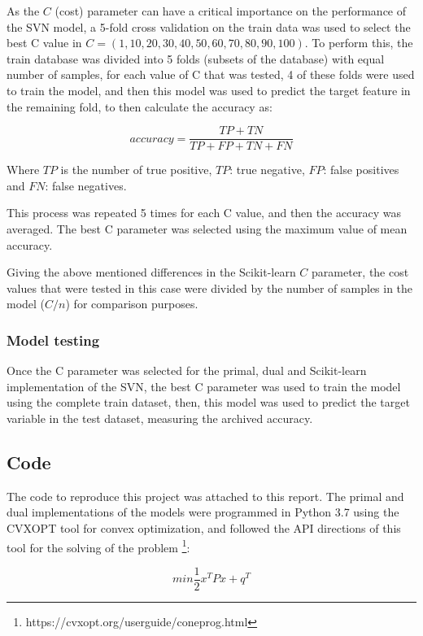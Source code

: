 \documentclass[11pt,twocolumn,letterpaper]{article}
\begin{document}
As the $C$ (cost) parameter can have a critical importance on the performance of the SVN model, a 5-fold cross validation on the train data was used to select the best C value in $C = (1,10,20,30,40,50,60,70,80,90,100)$. To perform this, the train database was divided into 5 folds (subsets of the database) with equal number of samples, for each value of C that was tested, 4 of these folds were used to train the model, and then this model was used to predict the target feature in the remaining fold, to then calculate the accuracy as:

\begin{equation}
	accuracy = \frac{TP+TN}{TP+FP+TN+FN}
\end{equation}

Where $TP$ is the number of true positive, $TP$: true negative, $FP$: false positives and $FN$: false negatives.

This process was repeated 5 times for each C value, and then the accuracy was averaged. The best C parameter was selected using the maximum value of mean accuracy.

Giving the above mentioned differences in the Scikit-learn $C$ parameter, the cost values that were tested in this case were divided by the number of samples in the model ($C/n$) for comparison purposes.

\subsubsection{Model testing}

Once the C parameter was selected for the primal, dual and Scikit-learn implementation of the SVN, the best C parameter was used to train the model using the complete train dataset, then, this model was used to predict the target variable in the test dataset, measuring the archived accuracy. 

\subsection{Code}

The code to reproduce this project was attached to this report. The primal and dual implementations of the models were programmed in Python 3.7 using the CVXOPT tool for convex optimization, and followed the API directions of this tool for the solving of the problem \footnote{https://cvxopt.org/userguide/coneprog.html}:

\begin{equation}
	min \frac{1}{2} x^TPx + q^T
\end{equation}
\end{document}
